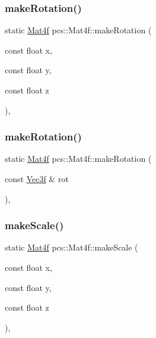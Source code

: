 \subsubsection{\texorpdfstring{make\+Rotation()}{makeRotation()}\hspace{0.1cm}{\footnotesize\ttfamily [1/2]}}
{\footnotesize\ttfamily static \hyperlink{structpcs_1_1Mat4f}{Mat4f} pcs\+::\+Mat4f\+::make\+Rotation (\begin{DoxyParamCaption}\item[{const float}]{x,  }\item[{const float}]{y,  }\item[{const float}]{z }\end{DoxyParamCaption})\hspace{0.3cm}{\ttfamily [inline]}, {\ttfamily [static]}}

\mbox{\label{structpcs_1_1Mat4f_a46b7418d93345a9609304b54fea5ed98}} 
\subsubsection{\texorpdfstring{make\+Rotation()}{makeRotation()}\hspace{0.1cm}{\footnotesize\ttfamily [2/2]}}
{\footnotesize\ttfamily static \hyperlink{structpcs_1_1Mat4f}{Mat4f} pcs\+::\+Mat4f\+::make\+Rotation (\begin{DoxyParamCaption}\item[{const \hyperlink{namespacepcs_a68e0f517680976c17c810ffe6952cbab}{Vec3f} \&}]{rot }\end{DoxyParamCaption})\hspace{0.3cm}{\ttfamily [inline]}, {\ttfamily [static]}}

\mbox{\label{structpcs_1_1Mat4f_a76bf290cb265ba821bb1bb04b822f361}} 
\subsubsection{\texorpdfstring{make\+Scale()}{makeScale()}\hspace{0.1cm}{\footnotesize\ttfamily [1/2]}}
{\footnotesize\ttfamily static \hyperlink{structpcs_1_1Mat4f}{Mat4f} pcs\+::\+Mat4f\+::make\+Scale (\begin{DoxyParamCaption}\item[{const float}]{x,  }\item[{const float}]{y,  }\item[{const float}]{z }\end{DoxyParamCaption})\hspace{0.3cm}{\ttfamily [inline]}, {\ttfamily [static]}}

